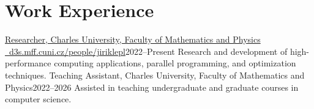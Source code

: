 \section{Work Experience}

\resumeSubHeadingListStart
  \resumeSubheading
    {\href{https://d3s.mff.cuni.cz/people/jiriklepl/}{Researcher, \small Charles University, Faculty of Mathematics and Physics \quad \footnotesize{}\ d3s.mff.cuni.cz/people/jiriklepl}}{2022--Present}
    {Research and development of high-performance computing applications, parallel programming, and optimization techniques.}{}
  \resumeSubheading
    {Teaching Assistant, \small Charles University, Faculty of Mathematics and Physics}{2022--2026}
    {Assisted in teaching undergraduate and graduate courses in computer science.}{}
\resumeSubHeadingListEnd
